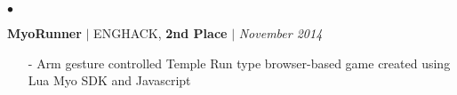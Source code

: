 \documentclass[11pt]{article}
\newenvironment{achievements}{\begin{list}{$\bullet$}{\topsep 0pt \itemsep -1.5pt \leftmargin 5pt}}{\vspace*{4pt}\end{list}}
\begin{document}
\begin{achievements}


\vspace{7pt}

\item\textbf{MyoRunner} {$|$ \scriptsize ENGHACK, \textbf{2nd Place} }  $|$  \href{https://github.com/nakulpathak3/myorunner}{\faGithub} \hfill \textit {November 2014}
\vspace{2pt}
\begin{itemize}
    \item[-]Arm gesture controlled Temple Run type browser-based game created using Lua Myo SDK and Javascript
\end{itemize}






\end{achievements}
\end{document}
